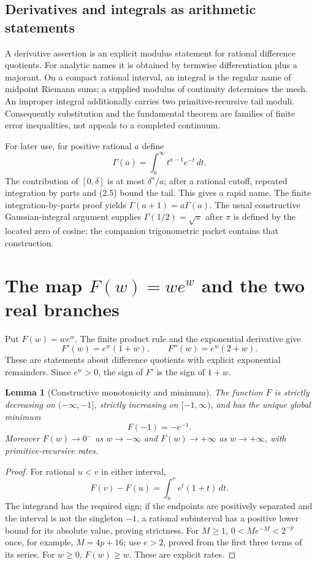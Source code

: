 \documentclass[11pt]{article}
\newtheorem{lemma}[theorem]{Lemma}
\theoremstyle{definition}
\begin{document}
\subsection{Derivatives and integrals as arithmetic statements}

A derivative assertion is an explicit modulus statement for rational difference
quotients.  For analytic names it is obtained by termwise differentiation plus
a majorant.  On a compact rational interval, an integral is the regular name
of midpoint Riemann sums; a supplied modulus of continuity determines the mesh.
An improper integral additionally carries two primitive-recursive tail
moduli.  Consequently substitution and the fundamental theorem are families of
finite error inequalities, not appeals to a completed continuum.

For later use, for positive rational \(a\) define
\[
 \Gamma(a)=\int_0^\infty t^{a-1}e^{-t}\,dt.
 \tag{2.9}
\]
The contribution of \([0,\delta]\) is at most \(\delta^a/a\); after a rational
cutoff, repeated integration by parts and (2.5) bound the tail.  This gives a
rapid name.  The finite integration-by-parts proof yields
\(\Gamma(a+1)=a\Gamma(a)\).  The usual constructive Gaussian-integral
argument supplies \(\Gamma(1/2)=\sqrt\pi\) after \(\pi\) is defined by the
located zero of cosine; the companion trigonometric packet contains that
construction.

\section{The map \texorpdfstring{\(F(w)=w e^w\)}{F(w)=w exp(w)} and the two real branches}\label{sec:realbranches}

Put \(F(w)=we^w\).  The finite product rule and the exponential derivative give
\[
 F'(w)=e^w(1+w),\qquad F''(w)=e^w(2+w).
 \tag{3.1}
\]
These are statements about difference quotients with explicit exponential
remainders.  Since \(e^w>0\), the sign of \(F'\) is the sign of \(1+w\).

\begin{lemma}[Constructive monotonicity and minimum]\label{lem:Fmono}
The function \(F\) is strictly decreasing on \(( -\infty,-1]\), strictly
increasing on \([-1,\infty)\), and has the unique global minimum
\[
 F(-1)=-e^{-1}.
\]
Moreover \(F(w)\to0^-\) as \(w\to-\infty\) and \(F(w)\to+\infty\) as
\(w\to+\infty\), with primitive-recursive rates.
\end{lemma}

\begin{proof}
For rational \(u<v\) in either interval,
\[
 F(v)-F(u)=\int_u^v e^t(1+t)\,dt.
\]
The integrand has the required sign; if the endpoints are positively separated
and the interval is not the singleton \(-1\), a rational subinterval has a
positive lower bound for its absolute value, proving strictness.  For
\(M\ge1\), \(0<M e^{-M}<2^{-p}\) once, for example,
\(M=4p+16\); use \(e>2\), proved from the first three terms of its series.
For \(w\ge0\), \(F(w)\ge w\).  These are explicit rates.
\end{proof}
\end{document}
